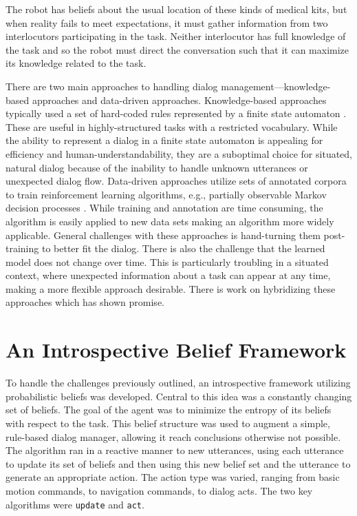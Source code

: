 \documentclass[12pt]{article}
\begin{document}
The robot has beliefs about the usual location of these kinds of
medical kits, but when reality fails to meet expectations, it must
gather information from two interlocutors participating in the
task. Neither interlocutor has full knowledge of the task and so the
robot must direct the conversation such that it can maximize its
knowledge related to the task.

There are two main approaches to handling dialog
management---knowledge-based approaches and data-driven approaches.
Knowledge-based approaches typically used a set of hard-coded rules
represented by a finite state automaton
\cite{Lee2010:dialog-management}. These are useful in
highly-structured tasks with a restricted vocabulary. While the
ability to represent a dialog in a finite state automaton is appealing
for efficiency and human-understandability, they are a suboptimal
choice for situated, natural dialog because of the inability to handle
unknown utterances or unexpected dialog flow. Data-driven approaches
utilize sets of annotated corpora to train reinforcement learning
algorithms, e.g., partially observable Markov decision processes
\cite{Young2013:dialog-pomdp}. While training and annotation are time
consuming, the algorithm is easily applied to new data sets making an
algorithm more widely applicable. General challenges with these
approaches is hand-turning them post-training to better fit the
dialog. There is also the challenge that the learned model does not
change over time. This is particularly troubling in a situated
context, where unexpected information about a task can appear at any
time, making a more flexible approach desirable. There is work on
hybridizing these approaches which has shown promise.

\section{An Introspective Belief Framework}
\label{sec:framework}
To handle the challenges previously outlined, an introspective
framework utilizing probabilistic beliefs was developed. Central to
this idea was a constantly changing set of beliefs. The goal of the
agent was to minimize the entropy of its beliefs with respect to the
task. This belief structure was used to augment a simple, rule-based
dialog manager, allowing it reach conclusions otherwise not
possible. The algorithm ran in a reactive manner to new utterances,
using each utterance to update its set of beliefs and then using this
new belief set and the utterance to generate an appropriate
action. The action type was varied, ranging from basic motion
commands, to navigation commands, to dialog acts. The two key
algorithms were \texttt{update} and \texttt{act}.
\end{document}
